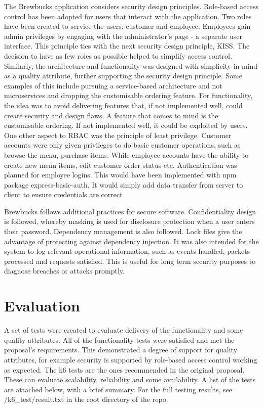 \documentclass{article}
\begin{document}
\medskip \noindent The Brewbucks application considers security design principles. Role-based access control has been adopted for users that interact with the application. Two roles have been created to service the users: customer and employee. Employees gain admin privileges by engaging with the administrator's page - a separate user interface. This principle ties with the next security design principle, KISS. The decision to have as few roles as possible helped to simplify access control. Similarly, the architecture and functionality was designed with simplicity in mind as a quality attribute, further supporting the security design principle. Some examples of this include pursuing a service-based architecture and not microservices and dropping the customisable ordering feature. For functionality, the idea was to avoid delivering features that, if not implemented well, could create security and design flaws. A feature that comes to mind is the customisable ordering. If not implemented well, it could be exploited by users. One other aspect to RBAC was the principle of least privilege. Customer accounts were only given privileges to do basic customer operations, such as browse the menu, purchase items. While employee accounts have the ability to create new menu items, edit customer order status etc. Authentication was planned for employee logins. This would have been implemented with npm package express-basic-auth. It would simply add data transfer from server to client to ensure credentials are correct

\medskip \noindent Brewbucks follows additional practices for secure software. Confidentiality design is followed, whereby masking is used for disclosure protection when a user enters their password. Dependency management is also followed. Lock files give the advantage of protecting against dependency injection. It was also intended for the system to log relevant operational information, such as events handled, packets processed and requests satisfied. This is useful for long term security purposes to diagnose breaches or attacks promptly.

\section{Evaluation}
A set of tests were created to evaluate delivery of the functionality and some quality attributes. All of the functionality tests were satisfied and met the proposal's requirements. This demonstrated a degree of support for quality attributes, for example security is supported by role-based access control working as expected. The k6 tests are the ones recommended in the original proposal. These can evaluate scalability, reliability and some availability. A list of the tests are attached below, with a brief summary. For the full testing results, see /k6\_test/result.txt in the root directory of the repo.
\end{document}
